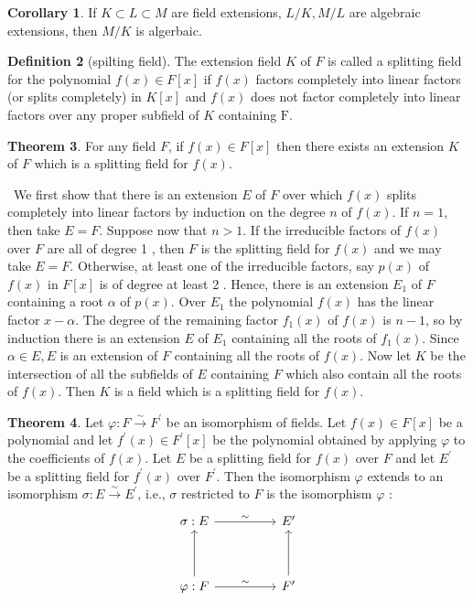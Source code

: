 \documentclass[a4paper,12pt]{article}
\newenvironment{prooff}{{\noindent\it\textcolor{cyan!40!black}{Proof}:}\,}{\par}
\theoremstyle{definition}
\newtheorem{defn}{Definition}[subsection]
\newtheorem{coro}[defn]{Corollary}
\newtheorem{theo}[defn]{Theorem}
\begin{document}
\begin{coro}
    If $K\subset L\subset M$ are field extensions, $L/K,M/L$ are algebraic extensions, then $M/K$ is algerbaic.
    \label{corollary:algebraic extension is transitive}
\end{coro}
\begin{defn}[spilting field]
    The extension field $K$ of $F$ is called a splitting field for the polynomial $f(x) \in F[x]$ if $f(x)$ factors completely into linear factors (or splits completely) in $K[x]$ and $f(x)$ does not factor completely into linear factors over any proper subfield of $K$ containing $\mathrm{F}$.
\end{defn}
\begin{theo}
    For any field $F$, if $f(x) \in F[x]$ then there exists an extension $K$ of $F$ which is a splitting field for $f(x)$.
\end{theo}
\begin{prooff}
    We first show that there is an extension $E$ of $F$ over which $f(x)$ splits completely into linear factors by induction on the degree $n$ of $f(x)$. If $n=1$, then take $E=F$. Suppose now that $n>1$. If the irreducible factors of $f(x)$ over $F$ are all of degree 1 , then $F$ is the splitting field for $f(x)$ and we may take $E=F$. Otherwise, at least one of the irreducible factors, say $p(x)$ of $f(x)$ in $F[x]$ is of degree at least 2 . Hence, there is an extension $E_1$ of $F$ containing a root $\alpha$ of $p(x)$. Over $E_1$ the polynomial $f(x)$ has the linear factor $x-\alpha$. The degree of the remaining factor $f_1(x)$ of $f(x)$ is $n-1$, so by induction there is an extension $E$ of $E_1$ containing all the roots of $f_1(x)$. Since $\alpha \in E, E$ is an extension of $F$ containing all the roots of $f(x)$. Now let $K$ be the intersection of all the subfields of $E$ containing $F$ which also contain all the roots of $f(x)$. Then $K$ is a field which is a splitting field for $f(x)$.
\end{prooff}
\begin{theo}
    Let $\varphi: F \xrightarrow{\sim} F^{\prime}$ be an isomorphism of fields. Let $f(x) \in F[x]$ be a polynomial and let $f^{\prime}(x) \in F^{\prime}[x]$ be the polynomial obtained by applying $\varphi$ to the coefficients of $f(x)$. Let $E$ be a splitting field for $f(x)$ over $F$ and let $E^{\prime}$ be a splitting field for $f^{\prime}(x)$ over $F^{\prime}$. Then the isomorphism $\varphi$ extends to an isomorphism $\sigma: E \xrightarrow{\sim} E^{\prime}$, i.e., $\sigma$ restricted to $F$ is the isomorphism $\varphi$ :
    \[\begin{tikzcd}
            {\sigma:E} && {E^{\prime}} \\
            \\
            {\varphi:F} && {F^{\prime}}
            \arrow["\sim", from=1-1, to=1-3]
            \arrow["\sim", from=3-1, to=3-3]
            \arrow[from=3-1, to=1-1]
            \arrow[from=3-3, to=1-3]
        \end{tikzcd}\]
\end{theo}
\end{document}
